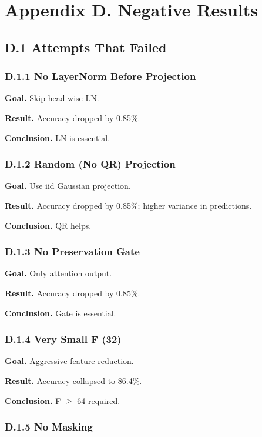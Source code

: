 \section{Appendix D. Negative Results}

\subsection{D.1 Attempts That Failed}

\subsubsection{D.1.1 No LayerNorm Before Projection}

\textbf{Goal.} Skip head-wise LN.

\textbf{Result.} Accuracy dropped by 0.85\%.

\textbf{Conclusion.} LN is essential.

\subsubsection{D.1.2 Random (No QR) Projection}

\textbf{Goal.} Use iid Gaussian projection.

\textbf{Result.} Accuracy dropped by 0.85\%; higher variance in 
predictions.

\textbf{Conclusion.} QR helps.

\subsubsection{D.1.3 No Preservation Gate}

\textbf{Goal.} Only attention output.

\textbf{Result.} Accuracy dropped by 0.85\%.

\textbf{Conclusion.} Gate is essential.

\subsubsection{D.1.4 Very Small F (32)}

\textbf{Goal.} Aggressive feature reduction.

\textbf{Result.} Accuracy collapsed to 86.4\%.

\textbf{Conclusion.} F $\ge$ 64 required.

\subsubsection{D.1.5 No Masking}


